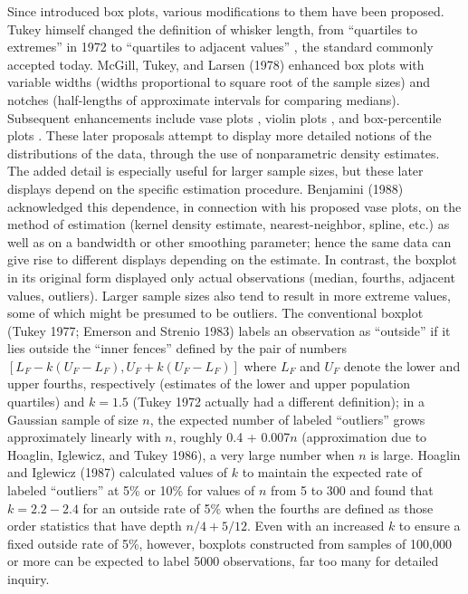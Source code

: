 \documentclass[11pt]{article}
\begin{document}
Since  \citet{tukey72} introduced box plots, various modifications 
to them have been proposed.  
Tukey himself changed the definition of whisker length,
from  ``quartiles to extremes'' in 1972
to  ``quartiles to adjacent values'' \citep{eda},
the standard commonly accepted today.
McGill, Tukey, and Larsen (1978) enhanced box plots with 
variable widths (widths proportional to square root of 
the sample sizes) and notches (half-lengths of approximate 
intervals for comparing medians). Subsequent enhancements
include vase plots \citep{vase}, violin plots \citep{violin}, 
and box-percentile plots \citep{box.percentiles}.
These later proposals attempt to display more detailed
notions of the distributions of the data, through the use
of nonparametric density estimates.  The added detail is
especially useful for larger sample sizes, but these later 
displays depend on the specific estimation procedure.  
Benjamini (1988) acknowledged this dependence, in connection 
with his proposed vase plots, on the method of estimation
(kernel density estimate, nearest-neighbor, spline, etc.)
as well as on a bandwidth or other smoothing parameter; 
hence the same data can give rise to different displays
depending on the estimate.  In contrast, the boxplot in  
its original form displayed only actual observations 
(median, fourths, adjacent values, outliers).  
Larger sample sizes also tend to result in more extreme
values, some of which might be presumed to be outliers.
The conventional boxplot (Tukey 1977; Emerson and Strenio
1983) labels an observation as ``outside'' if it lies 
outside the ``inner fences'' defined by the pair of 
numbers $[L_F - k(U_F - L_F), U_F + k(U_F - L_F)]$ 
where $L_F$ and $U_F$ denote the lower and upper
fourths, respectively (estimates of the lower and
upper population quartiles) and $k = 1.5$ (Tukey 1972 
actually had a different definition);
in a Gaussian sample of size $n$,
the expected number of labeled ``outliers'' grows 
approximately linearly with $n$, roughly
0.4 + 0.007$n$ (approximation due to Hoaglin, Iglewicz, 
and Tukey 1986), a very large number when $n$ is large.  
Hoaglin and Iglewicz (1987) calculated values of $k$ to 
maintain the expected rate of labeled ``outliers'' at 5\% 
or 10\% for values of $n$ from 5 to 300 and found that
$k = 2.2-2.4$ for an outside rate of 5\% when the
fourths are defined as those order statistics that
have depth $n/4 + 5/12$.  Even with an increased $k$
to ensure a fixed outside rate of 5\%, however, 
boxplots constructed from samples of 100,000 or more
can be expected to label 5000 observations, far too
many for detailed inquiry.
\end{document}
